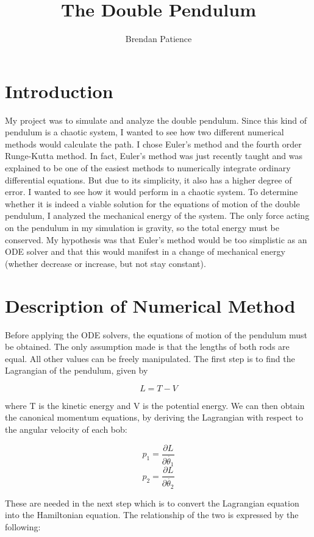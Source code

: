 \documentclass[a4paper,12pt]{article}
\title{The Double Pendulum}
\author{Brendan Patience}
\begin{document}
\maketitle

\section*{Introduction}

My project was to simulate and analyze the double pendulum. Since this kind
of pendulum is a chaotic system, I wanted to see how two different numerical
methods would calculate the path. I chose Euler's method and the fourth
order Runge-Kutta method. In fact, Euler's method was just recently taught
and was explained to be one  of the easiest methods to numerically integrate
ordinary differential equations. But due to its simplicity, it also has a
higher degree of error. I wanted to see how it would perform in a chaotic
system. To determine whether it is indeed a viable solution for the equations
of motion of the double pendulum, I analyzed the mechanical energy of the
system. The only force acting on the pendulum in my simulation is gravity, 
so the total energy must be conserved. My hypothesis was that Euler's method
would be too simplistic as an ODE solver and that this would manifest in
a change of mechanical energy (whether decrease or increase, but not stay
constant).

\section*{Description of Numerical Method}

Before applying the ODE solvers, the equations of motion of the pendulum
must be obtained. The only assumption made is that the lengths of both 
rods are equal. All other values can be freely manipulated. The first 
step is to find the Lagrangian of the pendulum, given by

\[L = T - V \]

where T is the kinetic energy and V is the potential energy. We can then
obtain the canonical momentum equations, by deriving the Lagrangian with
respect to the angular velocity of each bob:

\[p_1 = \frac{\partial L}{\partial \dot{\theta_1}} \]
\[p_2 = \frac{\partial L}{\partial \dot{\theta_2}} \]

These are needed in the next step which is to convert the Lagrangian 
equation into the Hamiltonian equation. The relationship of the two is
expressed by the following:
\end{document}
